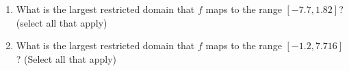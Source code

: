 \documentclass{ximera}
\begin{document}
\begin{exercise}
\begin{enumerate}
          \begin{multipleChoice}
          	\choice{$ [-6, -1.9] $}
          	\choice{$ [-6, 0] $}
          	\choice{$ [-6, 3.3] $}
          	\choice{$ \left[f(-6), f(3.3)\right] $}
          	\choice[correct]{$ [-6, 5.8] $}
          \end{multipleChoice}
        \item What is the largest restricted domain that $ f $ maps to the range $ [-7.7, 1.82] $?  (select all that apply)
          \begin{multipleChoice}
          	\choice{$ [-6, -1] $}
          	\choice[correct]{$ [-6,-2.7] $}
          	\choice{$ [-6, 5.8] $}
          	\choice{$ \left[f(-6), f(5.8)\right] $}
          \end{multipleChoice}
        \item What is the largest restricted domain that $ f $ maps to the range $ [-1.2, 7.716] $?  (Select all that apply)
        \begin{multipleChoice}
        	\choice[correct]{$ [4, 7.2] $}
        	\choice{$ [2.4, 7.2] $}
        	\choice{[-4.5, 7.2]}
        \end{multipleChoice}
   \end{enumerate}
 \end{exercise}
\end{document}
